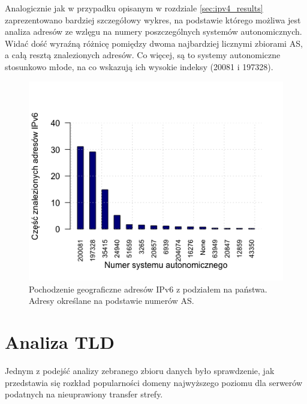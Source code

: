 Analogicznie jak w przypadku opisanym w rozdziale \ref{sec:ipv4_results} zaprezentowano bardziej szczegółowy wykres, na podstawie
którego możliwa jest analiza adresów ze wzlęgu na numery poszczególnych systemów autonomicznych. Widać dość wyraźną różnicę pomiędzy
dwoma najbardziej licznymi zbiorami AS, a całą resztą znalezionych adresów. Co więcej, są to systemy autonomiczne stosunkowo młode,
na co wskazują ich wysokie indeksy (20081 i 197328).
\begin{figure}[h]
	\centering
	\includegraphics[width=1.0\textwidth]{image/Ipv6_as_count_no_title}
	\caption{Pochodzenie geograficzne adresów IPv6 z podziałem na państwa. Adresy określane na podstawie numerów AS.}
	\label{fig:ipv6_co}
\end{figure}

\section{Analiza TLD}
Jednym z podejść analizy zebranego zbioru danych było sprawdzenie, jak przedstawia się rozkład popularności domeny najwyższego poziomu
dla serwerów podatnych na nieuprawiony transfer strefy.

